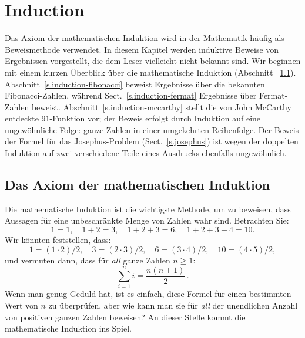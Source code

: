 
\chapter{Induction}\label{c.induction}


Das Axiom der mathematischen Induktion wird in der Mathematik häufig als Beweismethode verwendet. In diesem Kapitel werden induktive Beweise von Ergebnissen vorgestellt, die dem Leser vielleicht nicht bekannt sind. Wir beginnen mit einem kurzen Überblick über die mathematische Induktion (Abschnitt ~\ref{s.induction-axiom}). Abschnitt~\ref{s.induction-fibonacci} beweist Ergebnisse über die bekannten Fibonacci-Zahlen, während Sect.~\ref{s.induction-fermat} Ergebnisse über Fermat-Zahlen beweist. Abschnitt~\ref{s.induction-mccarthy} stellt die von John McCarthy entdeckte $91$-Funktion vor; der Beweis erfolgt durch Induktion auf eine ungewöhnliche Folge: ganze Zahlen in einer umgekehrten Reihenfolge. Der Beweis der Formel für das Josephus-Problem (Sect.~\ref{s.josephus}) ist wegen der doppelten Induktion auf zwei verschiedene Teile eines Ausdrucks ebenfalls ungewöhnlich.

\section{Das Axiom der mathematischen Induktion}\label{s.induction-axiom}


Die mathematische Induktion ist die wichtigste Methode, um zu beweisen, dass Aussagen für eine unbeschränkte Menge von Zahlen wahr sind. Betrachten Sie:
\[
1=1,\quad 1+2=3,\quad 1+2+3=6,\quad 1+2+3+4=10.
\]
Wir könnten feststellen, dass:
\[
1=(1\cdot 2)/2,\quad 3=(2\cdot 3)/2,\quad 6=(3\cdot 4)/2,\quad 10=(4\cdot 5)/2,
\]
und vermuten dann, dass für \emph{all} ganze Zahlen $n\geq 1$:
\[
\sum_{i=1}^n i = \frac{n(n+1)}{2}\,.
\]
Wenn man genug Geduld hat, ist es einfach, diese Formel für einen bestimmten Wert von $n$ zu überprüfen, aber wie kann man sie für \emph{all} der unendlichen Anzahl von positiven ganzen Zahlen beweisen? An dieser Stelle kommt die mathematische Induktion ins Spiel.

